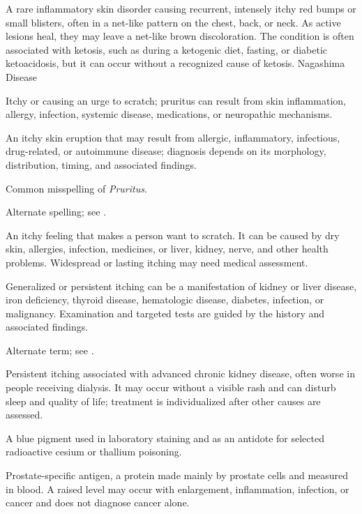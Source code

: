  A rare inflammatory skin disorder causing recurrent, intensely itchy red bumps or small blisters, often in a net-like pattern on the chest, back, or neck. As active lesions heal, they may leave a net-like brown discoloration. The condition is often associated with ketosis, such as during a ketogenic diet, fasting, or diabetic ketoacidosis, but it can occur without a recognized cause of ketosis.
\synonyms
Nagashima Disease

 Itchy or causing an urge to scratch; pruritus can result from skin inflammation, allergy, infection, systemic disease, medications, or neuropathic mechanisms.

 An itchy skin eruption that may result from allergic, inflammatory, infectious, drug-related, or autoimmune disease; diagnosis depends on its morphology, distribution, timing, and associated findings.

 Common misspelling of \textit{Pruritus}.

 Alternate spelling; see .

 An itchy feeling that makes a person want to scratch. It can be caused by dry skin, allergies, infection, medicines, or liver, kidney, nerve, and other health problems. Widespread or lasting itching may need medical assessment.

 Generalized or persistent itching can be a manifestation of kidney or liver disease, iron deficiency, thyroid disease, hematologic disease, diabetes, infection, or malignancy. Examination and targeted tests are guided by the history and associated findings.

 Alternate term; see .

 Persistent itching associated with advanced chronic kidney disease, often worse in people receiving dialysis. It may occur without a visible rash and can disturb sleep and quality of life; treatment is individualized after other causes are assessed.

 A blue pigment used in laboratory staining and as an antidote for selected radioactive cesium or thallium poisoning.

 Prostate-specific antigen, a protein made mainly by prostate cells and measured in blood. A raised level may occur with enlargement, inflammation, infection, or cancer and does not diagnose cancer alone.

